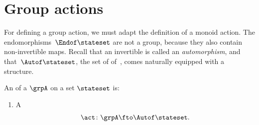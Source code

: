 
\section{Group actions}


For defining a group action, we must adapt the definition of a monoid action.
The endomorphisms~$\Endof\stateset$ are not a group, because they also contain non-invertible maps.
Recall that an invertible  is called an \emph{automorphism}, and that~$\Autof\stateset$, the set of  of~\stateset, comes naturally equipped with a  structure.


\begin{ctdefinition}
    \label{def:group-cov-action}
    An  of a  $\grpA$ on a set $\stateset$ is:

    \constit
    \begin{enumerate}
        \item A 
              \begin{equation}
                  \label{eq:act-group}
                  \act \colon \grpA \fto \Autof\stateset.
              \end{equation}
    \end{enumerate}
\end{ctdefinition}

